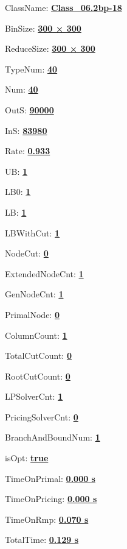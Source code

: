 \documentclass[11pt]{article}
\begin{document}
\pagestyle{empty}


ClassName: \underline{\textbf{Class_06.2bp-18}}
\par
BinSize: \underline{\textbf{300 × 300}}
\par
ReduceSize: \underline{\textbf{300 × 300}}
\par
TypeNum: \underline{\textbf{40}}
\par
Num: \underline{\textbf{40}}
\par
OutS: \underline{\textbf{90000}}
\par
InS: \underline{\textbf{83980}}
\par
Rate: \underline{\textbf{0.933}}
\par
UB: \underline{\textbf{1}}
\par
LB0: \underline{\textbf{1}}
\par
LB: \underline{\textbf{1}}
\par
LBWithCut: \underline{\textbf{1}}
\par
NodeCut: \underline{\textbf{0}}
\par
ExtendedNodeCnt: \underline{\textbf{1}}
\par
GenNodeCnt: \underline{\textbf{1}}
\par
PrimalNode: \underline{\textbf{0}}
\par
ColumnCount: \underline{\textbf{1}}
\par
TotalCutCount: \underline{\textbf{0}}
\par
RootCutCount: \underline{\textbf{0}}
\par
LPSolverCnt: \underline{\textbf{1}}
\par
PricingSolverCnt: \underline{\textbf{0}}
\par
BranchAndBoundNum: \underline{\textbf{1}}
\par
isOpt: \underline{\textbf{true}}
\par
TimeOnPrimal: \underline{\textbf{0.000 s}}
\par
TimeOnPricing: \underline{\textbf{0.000 s}}
\par
TimeOnRmp: \underline{\textbf{0.070 s}}
\par
TotalTime: \underline{\textbf{0.129 s}}
\par
\newpage
\end{document}
